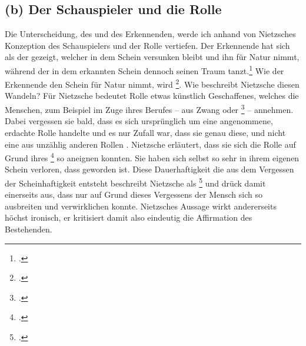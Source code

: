 \documentclass[12pt, a4paper, openany]{report}
\begin{document}
\subsection{(b) Der Schauspieler und die Rolle}
Die Unterscheidung, des  und des Erkennenden, werde ich anhand von Nietzsches Konzeption des Schauspielers und der Rolle vertiefen. 
Der Erkennende hat sich als der gezeigt, welcher in dem Schein versunken bleibt und ihn für Natur nimmt, während der  in dem erkannten Schein dennoch seinen Traum tanzt.\footcite[Vgl.][417]{nietzsche_morgenrote_1999}
Wie der Erkennende den Schein für Natur nimmt, wird \footcite[][595]{nietzsche_morgenrote_1999}.
Wie beschreibt Nietzsche diesen Wandeln?
Für Nietzsche bedeutet Rolle etwas künstlich Geschaffenes, welches die Menschen, zum Beispiel im Zuge ihres Berufes -- aus Zwang oder \footcite[][595]{nietzsche_morgenrote_1999} -- annehmen. 
Dabei vergessen sie bald, dass es sich ursprünglich um eine angenommene, erdachte Rolle handelte und es nur Zufall war, dass sie genau diese, und nicht eine aus unzählig anderen Rollen .
Nietzsche erläutert, dass sie sich die Rolle auf Grund ihres \footcite[][595]{nietzsche_morgenrote_1999} so aneignen konnten. 
Sie haben sich selbst so sehr in ihrem eigenen Schein verloren, dass  geworden ist. 
Diese Dauerhaftigkeit die aus dem Vergessen der Scheinhaftigkeit entsteht beschreibt Nietzsche als \footcite[][595]{nietzsche_morgenrote_1999} und drück damit einerseits aus, dass nur auf Grund dieses Vergessens der Mensch sich so ausbreiten und verwirklichen konnte.
Nietzsches Aussage wirkt andererseits höchst ironisch, er kritisiert damit also eindeutig die Affirmation des Bestehenden. 
\end{document}
